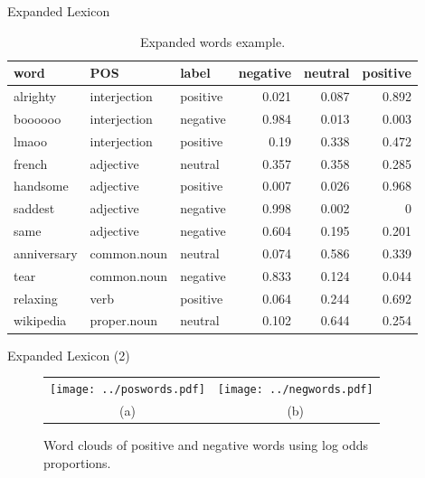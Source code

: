 \documentclass[handout]{beamer}
\begin{document}
\begin{frame}{Expanded Lexicon}
\begin{table}[htbp]
\scriptsize
\begin{tabular}{l|l|l|r|r|r}
\hline
word & POS & label & negative & neutral& positive \\ \hline
alrighty & interjection & positive & 0.021 & 0.087 & 0.892 \\ 
boooooo & interjection & negative & 0.984 & 0.013 & 0.003 \\ 
lmaoo & interjection & positive & 0.19 & 0.338 & 0.472 \\ 
french & adjective & neutral & 0.357 & 0.358 & 0.285 \\ 
handsome & adjective & positive & 0.007 & 0.026 & 0.968 \\ 
saddest & adjective & negative & 0.998 & 0.002 & 0 \\ 
same & adjective & negative & 0.604 & 0.195 & 0.201 \\ 
anniversary & common.noun & neutral & 0.074 & 0.586 & 0.339 \\ 
tear & common.noun & negative & 0.833 & 0.124 & 0.044 \\ 
relaxing & verb & positive & 0.064 & 0.244 & 0.692 \\ 
wikipedia & proper.noun & neutral & 0.102 & 0.644 & 0.254 \\ \hline
\end{tabular}
\caption{Expanded words example.}
\label{tab:expwords}
\end{table}
\end{frame}


\begin{frame}{Expanded Lexicon (2)}
\begin{figure}[ht]
\begin{center}
\begin{tabular}{cc}
\texttt{[image: ../poswords.pdf]}
&
\texttt{[image: ../negwords.pdf]}\\
(a) & (b)  
\end{tabular}
\caption{Word clouds of positive and negative words using log odds proportions.}
\label{fig:wordcloud}
\end{center}
\end{figure}
\end{frame}
\end{document}
